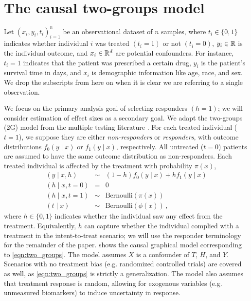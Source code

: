 %
\section{The causal two-groups model}
\label{sec:model}
Let $(x_i, y_i, t_i)_{i=1}^n$ be an observational dataset of $n$ samples, where $t_i \in \{0,1\}$ indicates whether individual $i$ was treated $(t_i=1)$ or not $(t_i=0)$, $y_i \in \mathbb{R}$ is the individual outcome, and $x_i \in \mathbb{R}^d$ are potential confounders. For instance, $t_i=1$ indicates that the patient was prescribed a certain drug, $y_i$ is the patient's survival time in days, and $x_i$ is demographic information like age, race, and sex. We drop the subscripts from here on when it is clear we are referring to a single observation.

We focus on the primary analysis goal of selecting responders $(h = 1)$; we will consider estimation of effect sizes as a secondary goal. We adapt the two-groups (2G) model from the multiple testing literature \citep{efron:2004,efron:2008}. For each treated individual ($t=1$), we suppose they are either \textit{non-responders} or \textit{responders}, with outcome distributions $f_0(y \mid x)$ or $f_1(y \mid x)$, respectively. All untreated ($t=0$) patients are assumed to have the same outcome distribution as non-responders. Each treated individual is affected by the treatment with probability $\pi(x)$,
\begin{equation}
\label{eqn:two_groups}
\begin{aligned}
(y \mid x, h) &\sim& (1-h) f_0(y \mid x) + h f_1(y \mid x) \\
(h \mid x, t=0) &=& 0 \\
(h \mid x, t=1) &\sim& \mbox{Bernoulli}(\pi(x)) \\
(t \mid x) &\sim& \mbox{Bernoulli}(\phi(x))  \, ,
\end{aligned}
\end{equation}
where $h \in \{0,1\}$ indicates whether the individual saw any effect from the treatment. Equivalently, $h$ can capture whether the individual complied with a treatment in the intent-to-treat scenario; we will use the responder terminology for the remainder of the paper.  shows the causal graphical model corresponding to \cref{eqn:two_groups}. The model assumes $X$ is a confounder of $T$, $H$, and $Y$. Scenarios with no treatment bias (e.g. randomized controlled trials) are covered as well, as \cref{eqn:two_groups} is strictly a generalization. The model also assumes that treatment response is random, allowing for exogenous variables (e.g. unmeasured biomarkers) to induce uncertainty in response. 

